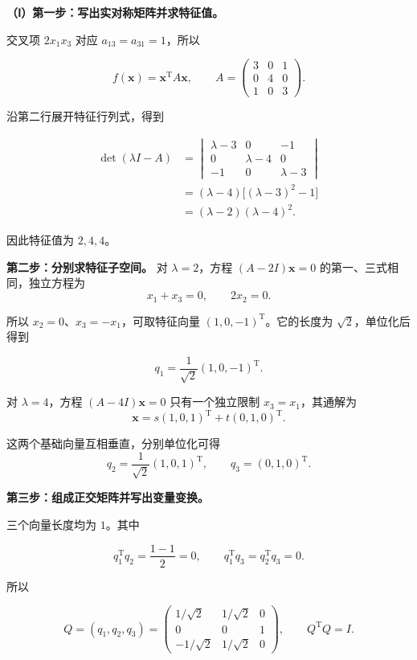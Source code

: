 \documentclass[UTF8,11pt,fontset=windows]{ctexart}
\begin{document}
\textbf{（Ⅰ）第一步：写出实对称矩阵并求特征值。}

交叉项 $2x_1x_3$ 对应 $a_{13}=a_{31}=1$，所以

$$
f(\boldsymbol x)=\boldsymbol x^{\mathrm T}A\boldsymbol x,
\qquad A=\begin{pmatrix}3&0&1\\0&4&0\\1&0&3\end{pmatrix}.
$$

沿第二行展开特征行列式，得到

$$
\begin{aligned}
\det(\lambda I-A)
&=\begin{vmatrix}\lambda-3&0&-1\\0&\lambda-4&0\\-1&0&\lambda-3\end{vmatrix}\\
&=(\lambda-4)\bigl[(\lambda-3)^2-1\bigr]\\
&=(\lambda-2)(\lambda-4)^2.
\end{aligned}
$$

因此特征值为 $2,4,4$。

\textbf{第二步：分别求特征子空间。} 对 $\lambda=2$，方程 $(A-2I)\boldsymbol x=0$ 的第一、三式相同，独立方程为
$$
x_1+x_3=0,\qquad 2x_2=0.
$$

所以 $x_2=0$、$x_3=-x_1$，可取特征向量 $(1,0,-1)^{\mathrm T}$。它的长度为 $\sqrt2$，单位化后得到

$$
q_1=\frac1{\sqrt2}(1,0,-1)^{\mathrm T}.
$$

对 $\lambda=4$，方程 $(A-4I)\boldsymbol x=0$ 只有一个独立限制 $x_3=x_1$，其通解为
$$
\boldsymbol x=s(1,0,1)^{\mathrm T}+t(0,1,0)^{\mathrm T}.
$$

这两个基础向量互相垂直，分别单位化可得
$$
q_2=\frac1{\sqrt2}(1,0,1)^{\mathrm T},\qquad
q_3=(0,1,0)^{\mathrm T}.
$$

\textbf{第三步：组成正交矩阵并写出变量变换。}

三个向量长度均为 $1$。其中

$$
q_1^{\mathrm T}q_2=\frac{1-1}{2}=0,
\qquad q_1^{\mathrm T}q_3=q_2^{\mathrm T}q_3=0.
$$

所以

$$
Q=(q_1,q_2,q_3)
=\begin{pmatrix}
1/\sqrt2&1/\sqrt2&0\\
0&0&1\\
-1/\sqrt2&1/\sqrt2&0
\end{pmatrix},
\qquad Q^{\mathrm T}Q=I.
$$
\end{document}
